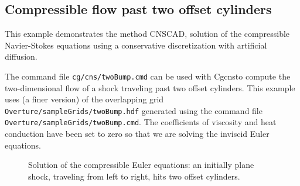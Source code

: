 \documentclass{article}
\newcommand{\obFigures}{\homeHenshaw/res/OverBlown/docFigures}  %
\newcommand{\cnsDocDir}{\homeHenshaw/cgDoc/cns}
\newcommand{\Solver}{Cgcns}
\begin{document}
\clearpage
\subsection{Compressible flow past two offset cylinders}

This example demonstrates the method CNSCAD, solution of the compressible Navier-Stokes equations
using a conservative discretization with artificial diffusion.

The command file {\tt cg/cns/twoBump.cmd} can be used with \Solver to compute the
two-dimensional flow of a shock traveling past two offset cylinders. 
This example uses (a finer version) of the overlapping grid {\tt Overture/\-sampleGrids/\-twoBump.hdf}  generated
using the command file {\tt Overture/\-sampleGrids/\-twoBump.cmd}.
The coefficients of viscosity and heat conduction have been set to zero so that we
are solving the inviscid Euler equations.

{
\newcommand{\figWidth}{10cm}
\newcommand{\trimfig}[2]{\trimPlot{#1}{#2}{.12}{.15}{.35}{.325}}
\begin{figure}[hbt]
\begin{center}
\end{center}
\caption{Solution of the compressible Euler equations: an initially plane shock, traveling from left to right,
    hits two offset cylinders.}
  \label{fig:cylinder}
\end{figure}
}


\end{document}
